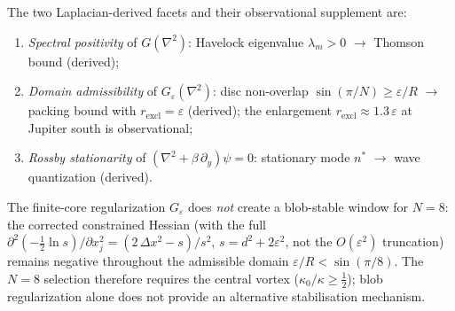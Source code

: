 \begin{remark}
The two Laplacian-derived facets and their observational supplement are:
\begin{enumerate}
  \item \emph{Spectral positivity} of $G(\nabla^2)$: Havelock
    eigenvalue $\lambda_m > 0$ $\to$ Thomson bound (derived);
  \item \emph{Domain admissibility} of $G_\varepsilon(\nabla^2)$:
    disc non-overlap $\sin(\pi/N) \ge \varepsilon/R$ $\to$ packing
    bound with $r_{\mathrm{excl}} = \varepsilon$ (derived);
    the enlargement $r_{\mathrm{excl}} \approx 1.3\,\varepsilon$
    at Jupiter south is observational;
  \item \emph{Rossby stationarity} of $(\nabla^2 + \beta\,\partial_y)\psi = 0$:
    stationary mode $n^*$ $\to$ wave quantization (derived).
\end{enumerate}
The finite-core regularization $G_\varepsilon$ does \emph{not} create
a blob-stable window for $N = 8$: the corrected constrained Hessian
(with the full $\partial^2(-\tfrac12\ln s)/\partial x_j^2
= (2\,\Delta x^2 - s)/s^2$, $s = d^2 + 2\varepsilon^2$, not
the $O(\varepsilon^2)$ truncation) remains negative throughout
the admissible domain $\varepsilon/R < \sin(\pi/8)$.
The $N = 8$ selection therefore requires the central vortex
($\kappa_0/\kappa \ge \tfrac{1}{2}$); blob regularization alone
does not provide an alternative stabilisation mechanism.
\end{remark}

